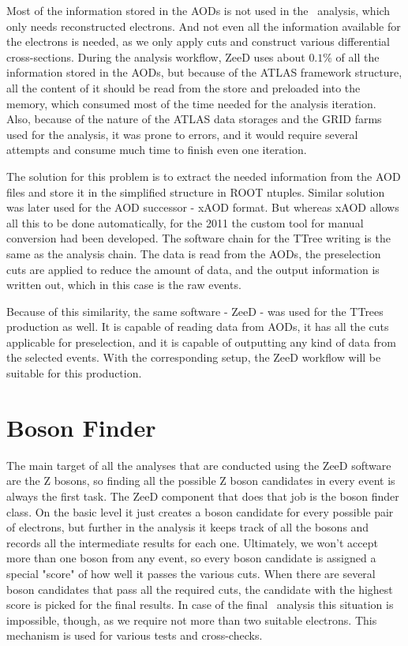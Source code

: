 Most of the information stored in the AODs is not used in the \Zee\ analysis, which only needs reconstructed electrons. And not even all the information available for the electrons is needed, as we only apply cuts and construct various differential cross-sections. During the analysis workflow, ZeeD uses about $0.1\%$ of all the information stored in the AODs, but because of the ATLAS framework structure, all the content of it should be read from the store and preloaded into the memory, which consumed most of the time needed for the analysis iteration. Also, because of the nature of the ATLAS data storages and the GRID farms used for the analysis, it was prone to errors, and it would require several attempts and consume much time to finish even one iteration.

The solution for this problem is to extract the needed information from the AOD files and store it in the simplified structure in ROOT ntuples. Similar solution was later used for the AOD successor - xAOD format. But whereas xAOD allows all this to be done automatically, for the 2011 the custom tool for manual conversion had been developed. The software chain for the TTree writing is the same as the analysis chain. The data is read from the AODs, the preselection cuts are applied to reduce the amount of data, and the output information is written out, which in this case is the raw events.

Because of this similarity, the same software - ZeeD - was used for the TTrees production as well. It is capable of reading data from AODs, it has all the cuts applicable for preselection, and it is capable of outputting any kind of data from the selected events. With the corresponding setup, the ZeeD workflow will be suitable for this production.

\section{Boson Finder}

The main target of all the analyses that are conducted using the ZeeD software are the Z bosons, so finding all the possible Z boson candidates in every event is always the first task. The ZeeD component that does that job is the boson finder class. On the basic level it just creates a boson candidate for every possible pair of electrons, but further in the analysis it keeps track of all the bosons and records all the intermediate results for each one. Ultimately, we won't accept more than one boson from any event, so every boson candidate is assigned a special "score" of how well it passes the various cuts. When there are several boson candidates that pass all the required cuts, the candidate with the highest score is picked for the final results. In case of the final \Zee\ analysis this situation is impossible, though, as we require not more than two suitable electrons. This mechanism is used for various tests and cross-checks.

